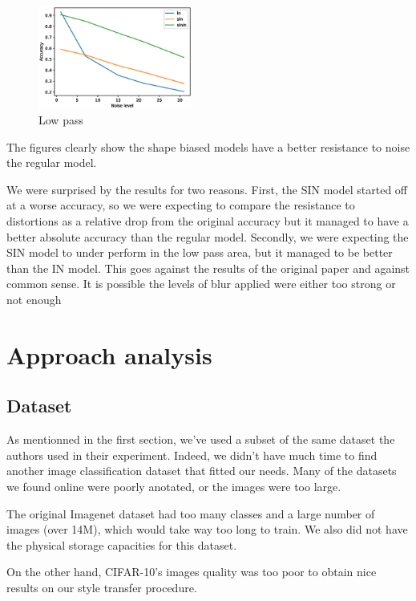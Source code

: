 \documentclass{article}
\begin{document}
\begin{figure}[h!]
\centering
\includegraphics[width = 0.45\textwidth]{imgs/low_pass}
\caption{Low pass}
\end{figure}

The figures clearly show the shape biased models have a better resistance to noise the regular model.

We were surprised by the results for two reasons.
First, the SIN model started off at a worse accuracy, so we were expecting to compare the resistance to distortions as a relative drop from the original accuracy but it managed to have a better absolute accuracy than the regular model.
Secondly, we were expecting the SIN model to under perform in the low pass area, but it managed to be better than the IN model. This goes against the results of the original paper and against common sense. It is possible the levels of blur applied were either too strong or not enough

\section{Approach analysis}

\subsection{Dataset}

As mentionned in the first section, we've used a subset of 
the same dataset the authors used in their experiment. 
Indeed, we didn't have much time to find another image classification dataset that fitted our needs.
Many of the datasets we found online were poorly anotated, or the images
were too large. \smallskip

\noindent
The original Imagenet dataset had too many classes and a large number of images (over 14M), 
which would take way too long to train. 
We also did not have the physical storage capacities for this dataset. \smallskip

\noindent
On the other hand, CIFAR-10's images quality was too poor 
to obtain nice results on our style transfer procedure. \smallskip
\end{document}
